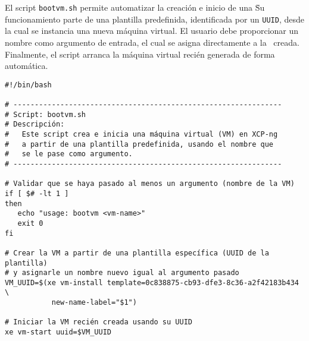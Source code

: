 El script \texttt{bootvm.sh} permite automatizar la creación e inicio de una \VM\. Su funcionamiento parte de una plantilla predefinida, identificada por un \texttt{UUID}, desde la cual se instancia una nueva máquina virtual. El usuario debe proporcionar un nombre como argumento de entrada, el cual se asigna directamente a la \VM\ creada. Finalmente, el script arranca la máquina virtual recién generada de forma automática. 

\begin{verbatim}
#!/bin/bash

# ---------------------------------------------------------------
# Script: bootvm.sh
# Descripción:
#   Este script crea e inicia una máquina virtual (VM) en XCP-ng 
#   a partir de una plantilla predefinida, usando el nombre que 
#   se le pase como argumento.
# ---------------------------------------------------------------

# Validar que se haya pasado al menos un argumento (nombre de la VM)
if [ $# -lt 1 ]
then
   echo "usage: bootvm <vm-name>"
   exit 0
fi

# Crear la VM a partir de una plantilla específica (UUID de la plantilla)
# y asignarle un nombre nuevo igual al argumento pasado
VM_UUID=$(xe vm-install template=0c838875-cb93-dfe3-8c36-a2f42183b434 \
           new-name-label="$1")

# Iniciar la VM recién creada usando su UUID
xe vm-start uuid=$VM_UUID
\end{verbatim}